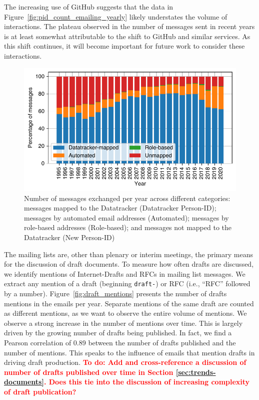 \documentclass[twocolumn,10pt]{article}
\newlength{\figureWidthOneColumn}
\newcommand{\todo}[1]{\textbf{\textcolor{red}{To do: #1}}}
\newcommand{\pb}[1]{\vspace{0.75ex}\noindent{\textbf{#1}}}
\begin{document}
The increasing use of GitHub suggests that the data in
Figure~\ref{fig:pid_count_emailing_yearly} likely understates the volume of
interactions. The plateau observed in the number of messages sent in recent
years is at least somewhat attributable to the shift to GitHub and similar
services. As this shift continues, it will become important for future work
to consider these interactions.

\begin{figure}
  \centering
  \includegraphics[width=\figureWidthOneColumn]{figures-prev/imc-2021/emails/frequency_emails_yearly_categories2.pdf}
  \caption{
    Number of messages exchanged per year across different categories:
    messages mapped to the Datatracker (Datatracker Person-ID); messages
    by automated email addresses (Automated); messages by role-based
    addresses (Role-based); and messages not mapped to the Datatracker
    (New Person-ID)
  }
  \label{fig:emailvol_by_year_catg}
\end{figure}

\pb{Discussion of draft documents:}
The mailing lists are, other than plenary or interim meetings, the primary
means for the discussion of draft documents. To measure how often drafts are
discussed, we identify mentions of Internet-Drafts and RFCs in mailing list
messages.  We extract any mention of a draft (beginning \texttt{draft-}) or
RFC (i.e., ``RFC'' followed by a number).  Figure~\ref{fig:draft_mentions}
presents the number of drafts mentions in the emails per year. Separate
mentions of the same draft are counted as different mentions, as we want to
observe the entire volume of mentions.  We observe a strong increase in the
number of mentions over time.  This is largely driven by the growing number
of drafts being published. In fact, we find a Pearson correlation of 0.89
between the number of drafts published and the number of mentions. This
speaks to the influence of emails that mention drafts in driving draft
production.
\todo{Add and cross-reference a discussion of number of drafts published
over time in Section \ref{sec:trends-documents}. Does this tie into the
discussion of increasing complexity of draft publication?}
\end{document}
